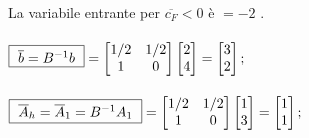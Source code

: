 \documentclass{article}
\begin{document}
\begin{preview}
                \paragraph{}
                La variabile entrante per $ \overline{c_F} < 0$ \quad \`{e} \quad {} $ = -2 $ \quad { \large $\implies$ }\quad {}.

                \paragraph{}
                \begin{math}
                        \framebox{ $ \overline{b} = B^{-1}b $ } = \begin{bmatrix}
                                1/2 & 1/2 \\
                                1 & 0
                        \end{bmatrix} \begin{bmatrix}
                                2 \\
                                4
                        \end{bmatrix} = \begin{bmatrix}
                                3 \\
                                2
                        \end{bmatrix};
                \end{math}

                \paragraph{}
                \begin{math}
                        \framebox{ $ \overline{A}_h = \overline{A}_1 = B^{-1}A_1 $ } = \begin{bmatrix}
                                1/2 & 1/2 \\
                                1 & 0
                        \end{bmatrix} \begin{bmatrix}
                                1 \\
                                3
                        \end{bmatrix} = \begin{bmatrix}
                                1 \\
                                1
                        \end{bmatrix};
                \end{math}


\end{preview}
\end{document}

